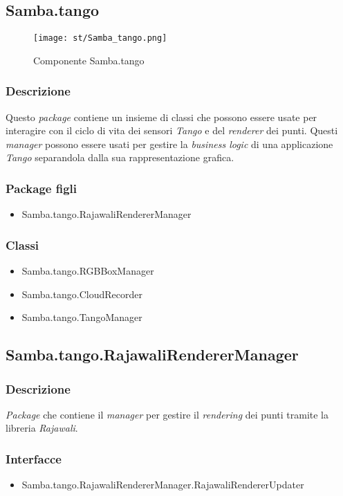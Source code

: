 \subsection{Samba.tango}\label{subs:samba-tango}
\begin{figure}[!h] 
    \centering 
    \texttt{[image: st/Samba\_tango.png]} 
    \caption{Componente Samba.tango}
\end{figure}
\subsubsection{Descrizione}
Questo \emph{package} contiene un insieme di classi che possono essere usate per interagire con il ciclo di vita dei sensori \emph{Tango} e del \emph{renderer} dei punti. Questi \emph{manager} possono essere usati per gestire la \emph{business logic} di una applicazione \emph{Tango} separandola dalla sua rappresentazione grafica.
\subsubsection{Package figli}
\begin{itemize}
	\item Samba.tango.RajawaliRendererManager
\end{itemize}
\subsubsection{Classi}
\begin{itemize}
	\item Samba.tango.RGBBoxManager
	\item Samba.tango.CloudRecorder
	\item Samba.tango.TangoManager
\end{itemize}

\subsection{Samba.tango.RajawaliRendererManager}
\subsubsection{Descrizione}
\emph{Package} che contiene il \emph{manager} per gestire il \emph{rendering} dei punti tramite la libreria \emph{Rajawali}.
\subsubsection{Interfacce}
\begin{itemize}
	\item Samba.tango.RajawaliRendererManager.RajawaliRendererUpdater
\end{itemize}
